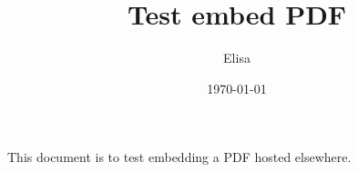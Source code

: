 \documentclass{article}
\title{Test embed PDF}
\date{\today}
\author{Elisa}
\begin{document}
This document is to test embedding a PDF hosted elsewhere.
\end{document}
